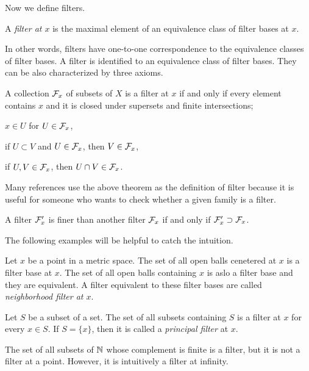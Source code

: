 \documentclass{../crs}
\begin{document}
Now we define filters.

\begin{defn}
A \emph{filter at $x$} is the maximal element of an equivalence class of filter bases at $x$.
\end{defn}

In other words, filters have one-to-one correspondence to the equivalence classes of filter bases.
A filter is identified to an equivalence class of filter bases.
They can be also characterized by three axioms.

\begin{thm}
A collection $\mathcal{F}_x$ of subsets of $X$ is a filter at $x$ if and only if every element contains $x$ and it is closed under supersets and finite intersections;
\begin{cond}
\item $x\in U$ for $U\in\mathcal{F}_x$,
\item if $U\subset V$ and $U\in\mathcal{F}_x$, then $V\in\mathcal{F}_x$,
\item if $U,V\in\mathcal{F}_x$, then $U\cap V\in\mathcal{F}_x$.
\end{cond}
\end{thm}
\begin{pf}
\end{pf}

Many references use the above theorem as the definition of filter because it is useful for someone who wants to check whether a given family is a filter.

\begin{thm}
A filter $\mathcal{F}'_x$ is finer than another filter $\mathcal{F}_x$ if and only if $\mathcal{F}'_x\supset\mathcal{F}_x$.
\end{thm}
\begin{pf}
\end{pf}

The following examples will be helpful to catch the intuition.

\begin{ex}
Let $x$ be a point in a metric space.
The set of all open balls cenetered at $x$ is a filter base at $x$.
The set of all open balls containing $x$ is aslo a filter base and they are equivalent.
A filter equivalent to these filter bases are called \emph{neighborhood filter at $x$}.
\end{ex}
\begin{ex}
Let $S$ be a subset of a set.
The set of all subsets containing $S$ is a filter at $x$ for every $x\in S$.
If $S=\{x\}$, then it is called a \emph{principal filter} at $x$.
\end{ex}
\begin{ex}
The set of all subsets of $\mathbb{N}$ whose complement is finite is a filter, but it is not a filter at a point.
However, it is intuitively a filter at infinity.
\end{ex}
\end{document}
